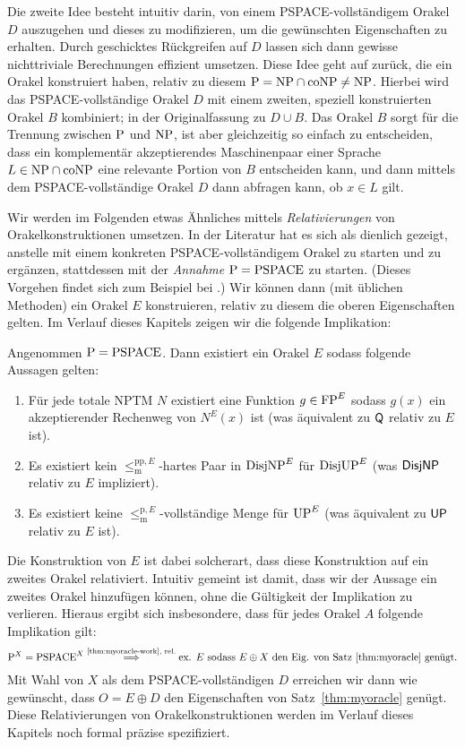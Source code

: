 Die zweite Idee besteht intuitiv darin, von einem PSPACE-vollständigem Orakel $D$ auszugehen und dieses zu modifizieren, um die gewünschten Eigenschaften zu erhalten. Durch geschicktes Rückgreifen auf $D$ lassen sich dann gewisse nichttriviale Berechnungen effizient umsetzen. Diese Idee geht auf \textcite{baker_relativizations_1975} zurück, die ein Orakel konstruiert haben, relativ zu diesem $\P=\NP\cap\coNP\neq\NP$. Hierbei wird das PSPACE-vollständige Orakel $D$ mit einem zweiten, speziell konstruierten Orakel $B$ kombiniert; in der Originalfassung zu $D\cup B$. Das Orakel $B$ sorgt für die Trennung zwischen $\P$ und $\NP$, ist aber gleichzeitig so einfach zu entscheiden, dass ein komplementär akzeptierendes Maschinenpaar einer Sprache $L\in\NP\cap\coNP$ eine relevante Portion von $B$ entscheiden kann, und dann mittels dem PSPACE-vollständige Orakel $D$ dann abfragen kann, ob $x\in L$ gilt.

Wir werden im Folgenden etwas Ähnliches mittels \emph{Relativierungen} von Orakelkonstruktionen umsetzen.
In der Literatur hat es sich als dienlich gezeigt, anstelle mit einem konkreten PSPACE-vollständigem Orakel zu starten und zu ergänzen, stattdessen mit der \emph{Annahme} $\P=\mathrm{PSPACE}$ zu starten. (Dieses Vorgehen findet sich zum Beispiel bei \cites{blum_generic_1987}{fortnow_separability_2002}{fenner_oracle_2003}.) 
Wir können dann (mit üblichen Methoden) ein Orakel $E$ konstruieren, relativ zu diesem die oberen Eigenschaften gelten. Im Verlauf dieses Kapitels zeigen wir die folgende Implikation:
\begin{theorem}\label{thm:myoracle-work}
    Angenommen $\P=\mathrm{PSPACE}$. Dann existiert ein Orakel $E$ sodass folgende Aussagen gelten:
    \begin{enumerate}
        \item Für jede totale NPTM $N$ existiert eine Funktion $g\in\FP^E$ sodass $g(x)$ ein akzeptierender Rechenweg von $N^E(x)$ ist (was äquivalent zu $\hQ$ relativ zu $E$ ist).
        \item Es existiert kein $\leq_\mathrm{m}^{\mathrm{pp},E}$-hartes Paar in $\DisjNP^E$ für $\DisjUP^E$ (was $\hDisjNP$ relativ zu $E$ impliziert).
        \item Es existiert keine $\leq_\mathrm{m}^{\mathrm{p},E}$-vollständige Menge für $\UP^E$ (was äquivalent zu $\hUP$ relativ zu $E$ ist).
    \end{enumerate}
\end{theorem}
Die Konstruktion von $E$ ist dabei solcherart, dass diese Konstruktion auf ein zweites Orakel relativiert. 
Intuitiv gemeint ist damit, dass wir der Aussage ein zweites Orakel hinzufügen können, ohne die Gültigkeit der Implikation zu verlieren. Hieraus ergibt sich insbesondere, dass für jedes Orakel $A$ folgende Implikation gilt:
\[ \P^X=\mathrm{PSPACE}^X \stackrel{\text{\ref{thm:myoracle-work}, rel.}}{\implies} \text{ex. $E$ sodass $E\oplus X$ den Eig. von Satz~\ref{thm:myoracle} genügt.} \]
Mit Wahl von $X$ als dem PSPACE-vollständigen $D$ erreichen wir dann wie gewünscht, dass $O=E\oplus D$ den Eigenschaften von Satz~\ref{thm:myoracle} genügt.
Diese Relativierungen von Orakelkonstruktionen werden im Verlauf dieses Kapitels noch formal präzise spezifiziert.



